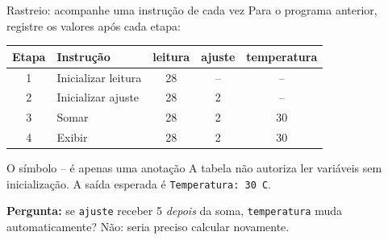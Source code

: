 \begin{frame}{Rastreio: acompanhe uma instrução de cada vez}
Para o programa anterior, registre os valores após cada etapa:
\begin{center}
\begin{tabular}{clccc}
\toprule
Etapa & Instrução & leitura & ajuste & temperatura \\
\midrule
1 & Inicializar leitura & 28 & -- & -- \\
2 & Inicializar ajuste & 28 & 2 & -- \\
3 & Somar & 28 & 2 & 30 \\
4 & Exibir & 28 & 2 & 30 \\
\bottomrule
\end{tabular}
\end{center}
\begin{alertblock}{O símbolo -- é apenas uma anotação}
A tabela não autoriza ler variáveis sem inicialização. A saída esperada é \texttt{Temperatura: 30 C}.
\end{alertblock}
\textbf{Pergunta:} se \texttt{ajuste} receber 5 \emph{depois} da soma, \texttt{temperatura} muda automaticamente? Não: seria preciso calcular novamente.
\end{frame}
